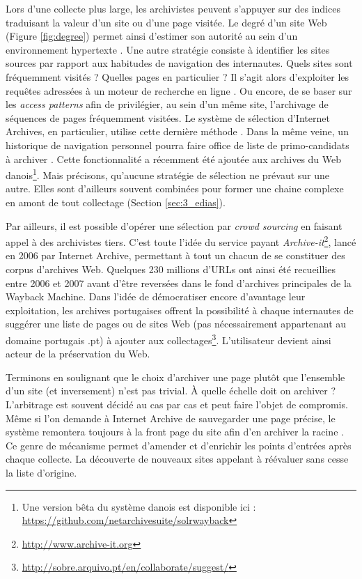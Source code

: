 \documentclass[symmetric,justified,marginals=raggedouter]{tufte-book}
\begin{document}
Lors d'une collecte plus large, les archivistes peuvent s'appuyer sur des indices traduisant la valeur d'un site ou d'une page visitée. Le degré d'un site Web (Figure \ref{fig:degree}) permet ainsi d'estimer son autorité au sein d'un environnement hypertexte \citep{abiteboul_first_2002}. Une autre stratégie consiste à identifier les sites sources par rapport aux habitudes de navigation des internautes. Quels sites sont fréquemment visités ? Quelles pages en particulier ? Il s'agit alors d'exploiter les requêtes adressées à un moteur de recherche en ligne \citep{pandey_user-centric_2005}. Ou encore, de se baser sur les \textit{access patterns} \citep{alnoamany_access_2013} afin de privilégier, au sein d'un même site, l'archivage de séquences de pages fréquemment visitées. Le système de sélection d'Internet Archives, en particulier, utilise cette dernière méthode \citep{kimpton_year-by-year:_2006}. Dans la même veine, un historique de navigation personnel pourra faire office de liste de primo-candidats à archiver \citep{dumais_stuff_2016}. Cette fonctionnalité a récemment été ajoutée aux archives du Web danois\footnote{Une version bêta du système danois est disponible ici : \url{https://github.com/netarchivesuite/solrwayback}}. Mais précisons, qu'aucune stratégie de sélection ne prévaut sur une autre. Elles sont d'ailleurs souvent combinées pour former une chaine complexe en amont de tout collectage (Section \ref{sec:3_edias}). 

Par ailleurs, il est possible d'opérer une sélection par \textit{crowd sourcing} en faisant appel à des archivistes tiers. C'est toute l'idée du service payant \textit{Archive-it}\footnote{\url{http://www.archive-it.org}}, lancé en 2006 par Internet Archive, permettant à tout un chacun de se constituer des corpus d'archives Web. Quelques 230 millions d'URLs ont ainsi été recueillies entre 2006 et 2007 avant d'être reversées dans le fond d'archives principales de la Wayback Machine. Dans l'idée de démocratiser encore d'avantage leur exploitation, les archives portugaises offrent la possibilité à chaque internautes de suggérer une liste de pages ou de sites Web (pas nécessairement appartenant au domaine portugais .pt) à ajouter aux  collectages\footnote{\url{http://sobre.arquivo.pt/en/collaborate/suggest/}}. L'utilisateur devient ainsi acteur de la préservation du Web.

Terminons en soulignant que le choix d'archiver une page plutôt que l'ensemble d'un site (et inversement) n'est pas trivial. À quelle échelle doit on archiver ? L'arbitrage est souvent décidé au cas par cas et peut faire l'objet de compromis. Même si l'on demande à Internet Archive de sauvegarder une page précise, le système remontera toujours à la front page du site afin d'en archiver la racine  \citep{kimpton_year-by-year:_2006}. Ce genre de mécanisme permet d'amender et d'enrichir les points d'entrées après chaque collecte. La découverte de nouveaux sites appelant à réévaluer sans cesse la liste d'origine.    
\end{document}
